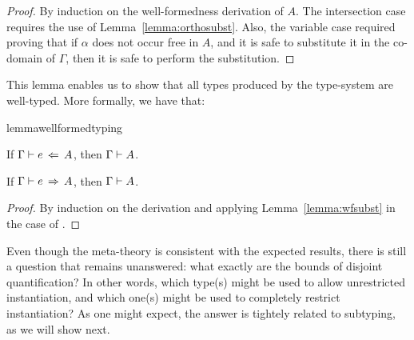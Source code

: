 \begin{proof}
By induction on the well-formedness derivation of $A$.
The intersection case requires the use of Lemma~\ref{lemma:orthosubst}.
Also, the variable case required proving that if $\alpha$ does not occur free in $A$, and it is safe
to substitute it in the co-domain of $\Gamma$, then it is safe to perform the substitution.
\end{proof}

This lemma enables us to show that all types produced by the type-system are well-typed.
More formally, we have that:

\begin{restatable}{lemma}{wellformedtyping}
  \label{lemma:wellformed-typing}

  If $\Gamma \vdash e \ \!\Leftarrow\! \ A$, then $\Gamma \vdash A$. 

  If $\Gamma \vdash e \ \!\Rightarrow\! \ A$, then $\Gamma \vdash A$.
\end{restatable}

\begin{proof}
  By induction on the derivation and applying
  Lemma~\ref{lemma:wfsubst} in the case of .
\end{proof}

Even though the meta-theory is consistent with the expected results, there is still a
question that remains unanswered: what exactly are the bounds of disjoint quantification?
In other words, which type(s) might be used to allow unrestricted instantiation, and which
one(s) might be used to completely restrict instantiation?
As one might expect, the answer is tightely related to subtyping, as we will show next. 

